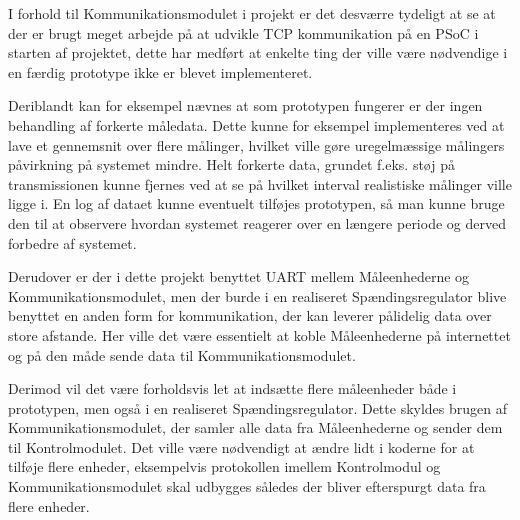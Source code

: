 
I forhold til Kommunikationsmodulet i projekt er det desværre tydeligt at se at der er brugt meget arbejde på at udvikle TCP kommunikation på en PSoC i starten af projektet, dette har medført at enkelte ting der ville være nødvendige i en færdig prototype ikke er blevet implementeret.

Deriblandt kan for eksempel nævnes at som prototypen fungerer er der ingen behandling af forkerte måledata. Dette kunne for eksempel implementeres ved at lave et gennemsnit over flere målinger, hvilket ville gøre uregelmæssige målingers påvirkning på systemet mindre. Helt forkerte data, grundet f.eks. støj på transmissionen kunne fjernes ved at se på hvilket interval realistiske målinger ville ligge i. En log af dataet kunne eventuelt tilføjes prototypen, så man kunne bruge den til at observere hvordan systemet reagerer over en længere periode og derved forbedre af systemet.

Derudover er der i dette projekt benyttet UART mellem Måleenhederne og Kommunikationsmodulet, men der burde i en realiseret Spændingsregulator blive benyttet en anden form for kommunikation, der kan leverer pålidelig data over store afstande. Her ville det være essentielt at koble Måleenhederne på internettet og på den måde sende data til Kommunikationsmodulet.

Derimod vil det være forholdsvis let at indsætte flere måleenheder både i prototypen, men også i en realiseret Spændingsregulator. Dette skyldes brugen af Kommunikationsmodulet, der samler alle data fra Måleenhederne og sender dem til Kontrolmodulet. Det ville være nødvendigt at ændre lidt i koderne for at tilføje flere enheder, eksempelvis protokollen imellem Kontrolmodul og Kommunikationsmodulet skal udbygges således der bliver efterspurgt data fra flere enheder.


